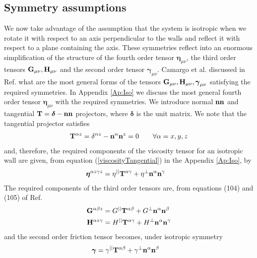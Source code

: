 \documentclass[b5paper,openright,10pt]{book}
\begin{document}
\subsection{Symmetry assumptions}
We now take  advantage of the assumption that the  system is isotropic
when we rotate  it with respect to an axis  perpendicular to the walls
and reflect  it with respect  to a  plane containing the  axis.  These
symmetries reflect into an enormous simplification of the structure of
the fourth order tensor  $\boldsymbol{\eta}_{\mu\nu}$, the third order
tensors  ${\bf  G}_{\mu\nu},{\bf  H}_{\mu\nu}$ and  the  second  order
tensor  $\boldsymbol{\gamma}_{\mu\nu}$.   Camargo et al. discussed in
Ref. \cite{CamargoBC2018} what are  the most  general forms  of the
tensors                     ${\bf                     G}_{\mu\nu},{\bf
  H}_{\mu\nu},\boldsymbol{\gamma}_{\mu\nu}$  satisfying  the  required
symmetries.  In Appendix \ref{Ap:Iso} we discuss
the most general fourth order tensor $\boldsymbol{\eta}_{\mu\nu}$ with
the required  symmetries.  We  introduce normal  ${\bf n}{\bf  n}$ and
tangential  ${\bf T}=\boldsymbol{\delta}-{\bf  n}{\bf n}$  projectors, where $\boldsymbol{\delta}$ is the unit matrix. 
We note that the tangential projector satisfies
\begin{align}
{\bf  T}^{\alpha  z}=\delta^{\alpha z}-{\bf n}^\alpha{\bf n}^z=0\quad\quad \forall \alpha=x,y,z
\label{T3}
\end{align}
and, therefore, the required components of the viscosity tensor for an
isotropic wall  are given, from equation (\ref{viscosityTangential}) in the
Appendix \ref{Ap:Iso}, by
\begin{align}
  \boldsymbol{\eta}^{\alpha z\gamma z}&=  
\eta^{||} {\bf T}^{\alpha\gamma}+\eta^{\bot} {\bf n}^\alpha  {\bf n}^\gamma 
\label{etasimple}
\end{align}
The  required components  of the  third order
tensors are, from  equations (104) and (105) of Ref. \cite{CamargoBC2018}
\begin{align}
{\bf G}^{\alpha\beta z}
&=G^{||}{\bf T}^{\alpha\beta}+
G^{\bot}{\bf n}^{\alpha}{\bf n}^{\beta}
\nonumber\\
{\bf H}^{\alpha z\gamma}
&=H^{||}{\bf T}^{\alpha\gamma}+
H^{\bot}{\bf n}^{\alpha}{\bf n}^{\gamma}
\label{GH}
\end{align}
and the second order friction tensor becomes, under
isotropic symmetry 
\begin{align}
\boldsymbol{\gamma}
&=\gamma^{||}{\bf T}^{\alpha\beta}+
\gamma^{\bot}{\bf n}^{\alpha}{\bf n}^{\beta}
\label{gg1}
\end{align}
\end{document}
